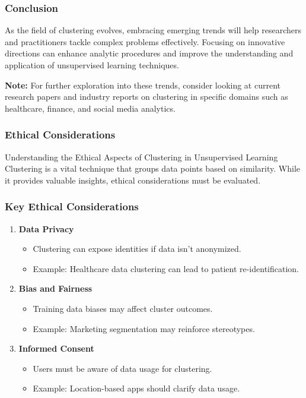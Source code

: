 \documentclass[aspectratio=169]{beamer}
\begin{document}
\begin{frame}[fragile]
    \frametitle{Conclusion}
    As the field of clustering evolves, embracing emerging trends will help researchers and practitioners tackle complex problems effectively. Focusing on innovative directions can enhance analytic procedures and improve the understanding and application of unsupervised learning techniques. 

    \textbf{Note:} For further exploration into these trends, consider looking at current research papers and industry reports on clustering in specific domains such as healthcare, finance, and social media analytics.
\end{frame}

\begin{frame}[fragile]
    \frametitle{Ethical Considerations}
    \begin{block}{Understanding the Ethical Aspects of Clustering in Unsupervised Learning}
        Clustering is a vital technique that groups data points based on similarity. While it provides valuable insights, ethical considerations must be evaluated.
    \end{block}
\end{frame}

\begin{frame}[fragile]
    \frametitle{Key Ethical Considerations}
    \begin{enumerate}
        \item \textbf{Data Privacy}
            \begin{itemize}
                \item Clustering can expose identities if data isn't anonymized.
                \item Example: Healthcare data clustering can lead to patient re-identification.
            \end{itemize}
            
        \item \textbf{Bias and Fairness}
            \begin{itemize}
                \item Training data biases may affect cluster outcomes.
                \item Example: Marketing segmentation may reinforce stereotypes.
            \end{itemize}
            
        \item \textbf{Informed Consent}
            \begin{itemize}
                \item Users must be aware of data usage for clustering.
                \item Example: Location-based apps should clarify data usage.
            \end{itemize}
    \end{enumerate}
\end{frame}
\end{document}
